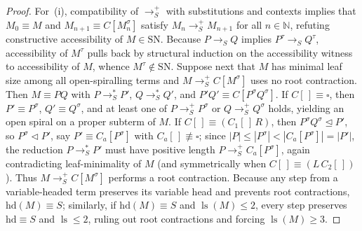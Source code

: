 \documentclass[11pt,reqno]{amsart}
\numberwithin{equation}{section}
\theoremstyle{plain}
\theoremstyle{definition}
\theoremstyle{remark}
\DeclareMathOperator{\ls}{ls}
\newcommand{\SN}{\mathrm{SN}}
\newcommand{\redS}{\to_S}
\newcommand{\redSp}{\to_S^+}
\newcommand{\redSs}{\to_S^*}
\begin{document}
\begin{proof}
For~(i), compatibility of $\redSp$ with substitutions and contexts implies that $M_0 \equiv M$ and $M_{n+1} \equiv C[M_n^\sigma]$ satisfy $M_n \redSp M_{n+1}$ for all $n \in \mathbb{N}$, refuting constructive accessibility of $M \in \SN$. Because $P \redS Q$ implies $P^\tau \redS Q^\tau$, accessibility of $M^\tau$ pulls back by structural induction on the accessibility witness to accessibility of $M$, whence $M^\tau \notin \SN$. Suppose next that $M$ has minimal leaf size among all open-spiralling terms and $M \redSp C[M^\sigma]$ uses no root contraction. Then $M \equiv P Q$ with $P \redSs P'$, $Q \redSs Q'$, and $P' Q' \equiv C[P^\sigma Q^\sigma]$. If $C[\,] \equiv \square$, then $P' \equiv P^\sigma$, $Q' \equiv Q^\sigma$, and at least one of $P \redSp P^\sigma$ or $Q \redSp Q^\sigma$ holds, yielding an open spiral on a proper subterm of $M$. If $C[\,] \equiv (C_1[\,]\,R)$, then $P^\sigma Q^\sigma \trianglelefteq P'$, so $P^\sigma \triangleleft P'$, say $P' \equiv C_a[P^\sigma]$ with $C_a[\,] \not\equiv \square$; since $|P| \le |P^\sigma| < |C_a[P^\sigma]| = |P'|$, the reduction $P \redSs P'$ must have positive length $P \redSp C_a[P^\sigma]$, again contradicting leaf-minimality of $M$ (and symmetrically when $C[\,] \equiv (L\,C_2[\,])$). Thus $M \redSp C[M^\sigma]$ performs a root contraction. Because any step from a variable-headed term preserves its variable head and prevents root contractions, $\mathrm{hd}(M) \equiv S$; similarly, if $\mathrm{hd}(M) \equiv S$ and $\ls(M) \le 2$, every step preserves $\mathrm{hd} \equiv S$ and $\ls \le 2$, ruling out root contractions and forcing $\ls(M) \ge 3$.


\end{proof}
\end{document}
